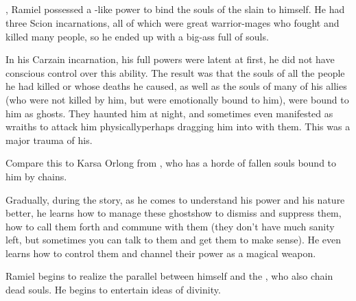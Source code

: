 \subsection{\Carcer}
, Ramiel possessed a \sephirah-like power to bind the souls of the slain to himself. 
He had three Scion incarnations, all of which were great warrior-mages who fought and killed many people, so he ended up with a big-ass \carcer{} full of souls. 

In his Carzain incarnation, his full \Malach{} powers were latent at first, he did not have conscious control over this ability. 
The result was that the souls of all the people he had killed or whose deaths he caused, as well as the souls of many of his allies (who were not killed by him, but were emotionally bound to him), were bound to him as ghosts. 
They haunted him at night, and sometimes even manifested as wraiths to attack him physically\dash perhaps dragging him into \Nyx{} with them. 
This was a major trauma of his. 

Compare this to Karsa Orlong from \cite{StevenEriksonIanCameronEsslemont:MalazanBookoftheFallen}, who has a horde of fallen souls bound to him by chains.

Gradually, during the story, as he comes to understand his power and his nature better, he learns how to manage these ghosts\dash how to dismiss and suppress them, how to call them forth and commune with them (they don't have much sanity left, but sometimes you can talk to them and get them to make sense). 
He even learns how to control them and channel their power as a magical weapon. 


Ramiel begins to realize the parallel between himself and the \Sephiroth, who also chain dead souls. He begins to entertain ideas of divinity. 

